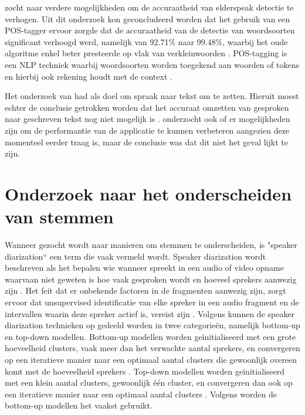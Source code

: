 \textcite{Branden2024} zocht naar verdere mogelijkheden om de accuraatheid van elderspeak detectie te verhogen. Uit dit onderzoek kon geconcludeerd worden dat het gebruik van een POS-tagger ervoor zorgde dat de accuraatheid van de detectie van woordsoorten significant verhoogd werd, namelijk van 92.71\% naar 99.48\%, waarbij het oude algoritme enkel beter presteerde op vlak van verkleinwoorden \autocite{Branden2024}. POS-tagging is een NLP techniek waarbij woordsoorten worden toegekend aan woorden of tokens en hierbij ook rekening houdt met de context \autocite{Branden2024}.

Het onderzoek van \textcite{Schryver2024} had als doel om spraak naar tekst om te zetten. Hieruit moest echter de conclusie getrokken worden dat het accuraat omzetten van gesproken naar geschreven tekst nog niet mogelijk is \autocite{Schryver2024}. \textcite{Schryver2024} onderzocht ook of er mogelijkheden zijn om de performantie van de applicatie te kunnen verbeteren aangezien deze momenteel eerder traag is, maar de conclusie was dat dit niet het geval lijkt te zijn.

\section{Onderzoek naar het onderscheiden van stemmen}
Wanneer gezocht wordt naar manieren om stemmen te onderscheiden, is "speaker diarization`` een term die vaak vermeld wordt. Speaker diarization wordt beschreven als het bepalen wie wanneer spreekt in een audio of video opname waarvaan niet geweten is hoe vaak gesproken wordt en hoeveel sprekers aanwezig zijn \autocite{AngueraMiro2012}. Het feit dat er onbekende factoren in de fragmenten aanwezig zijn, zorgt ervoor dat unsupervised identificatie van elke spreker in een audio fragment en de intervallen waarin deze spreker actief is, vereist zijn \autocite{AngueraMiro2012}. Volgens \textcite{AngueraMiro2012} kunnen de speaker diarization technieken op gedeeld worden in twee categorieën, namelijk bottom-up en top-down modellen. Bottom-up modellen worden geïnitialiseerd met een grote hoeveelheid clusters, vaak meer dan het verwachte aantal sprekers, en convergeren op een iteratieve manier naar een optimaal aantal clusters die gewoonlijk overeen komt met de hoeveelheid sprekers \autocite{AngueraMiro2012}. Top-down modellen worden geïnitialiseerd met een klein aantal clusters, gewoonlijk één cluster, en convergeren dan ook op een iteratieve manier naar een optimaal aantal clusters \autocite{AngueraMiro2012}. Volgens \textcite{AngueraMiro2012} worden de bottom-up modellen het vaakst gebruikt.


